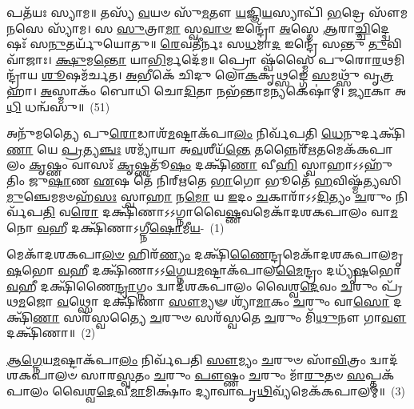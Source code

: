 𑌪𑌤᳴𑌯𑌃 𑌸𑍍𑌯𑌾𑌮॥ 𑌤𑌸𑍍𑌯᳴ \ul{𑌵}\-𑌯𑍞 𑌸𑍁᳴\-\ul{𑌮}\-𑌤𑍗 \ul{𑌯}\-𑌜𑍍𑌞𑌿\-\ul{𑌯}\-𑌸𑍍𑌯𑌾𑌪𑌿᳴ \ul{𑌭}\-𑌦𑍍𑌰𑍇 𑌸𑍗᳴𑌮\-\ul{𑌨}\-𑌸𑍇 𑌸𑍍𑌯𑌾᳴𑌮। 𑌸 \ul{𑌸𑍁}\-𑌤𑍍𑌰𑌾\-\ul{𑌮𑌾} 𑌸𑍍𑌵\-\ul{𑌵𑌾}\-\-\ul{𑍞} 𑌇𑌨𑍍𑌦𑍍𑌰𑍋᳴ \ul{𑌅}\-𑌸𑍍𑌮𑍇 \ul{𑌆}\-𑌰𑌾\-\ul{𑌚𑍍𑌚𑌿}\-𑌦𑍍𑌦𑍍𑌵𑍇𑌷𑌃᳴ 𑌸\-\ul{𑌨𑍁}\-𑌤𑌰𑍍𑌯𑍁᳴𑌯𑍋𑌤𑍁॥ \ul{𑌰𑍇}\-𑌵𑌤𑍀॑𑌰𑍍𑌨𑌃 𑌸\-\ul{𑌧}\-𑌮𑌾\-\ul{𑌦} 𑌇𑌨𑍍𑌦𑍍𑌰𑍇᳴ 𑌸𑌨𑍍𑌤𑍁 \ul{𑌤𑍁}\-𑌵𑌿𑌵𑌾᳴𑌜𑌾𑌃। \ul{𑌕𑍍𑌷𑍁}\-𑌮\-\ul{𑌨𑍍𑌤𑍋} 𑌯𑌾\-\ul{𑌭𑌿}\-𑌰𑍍𑌮𑌦𑍇᳴𑌮॥ 𑌪𑍍𑌰𑍋 𑌷𑍍𑌵᳴𑌸𑍍𑌮𑍈 𑌪𑍁𑌰𑍋\-\ul{𑌰}\-𑌥𑌮𑌿𑌨𑍍𑌦𑍍𑌰𑌾᳴𑌯 \ul{𑌶𑍂}\-𑌷𑌮᳴𑌰𑍍𑌚𑌤। \ul{𑌅}\-𑌭𑍀𑌕𑍇᳴ 𑌚𑌿𑌦𑍁 𑌲𑍋\-\ul{𑌕}\-𑌕𑍃\-\ul{𑌥𑍍𑌸}\-𑌙𑍍𑌗𑍇 \ul{𑌸}\-𑌮𑌥𑍍𑌸𑍁᳴ 𑌵𑍃\-\ul{𑌤𑍍𑌰}\-𑌹𑌾। \ul{𑌅}\-𑌸𑍍𑌮𑌾𑌕𑌂᳴ 𑌬𑍋𑌧𑌿 𑌚𑍋\-\ul{𑌦𑌿}\-𑌤𑌾 𑌨𑌭᳴𑌨𑍍𑌤𑌾𑌮\-\ul{𑌨𑍍𑌯}\-𑌕𑍇𑌷𑌾॑𑌮𑍍। \ul{𑌜𑍍𑌯𑌾}\-𑌕𑌾 𑌅\-\ul{𑌧𑌿} 𑌧𑌨𑍍𑌵᳴𑌸𑍁॥~(51)

{\anuvakamend[{\-\ul{𑌜}\-𑌰\-\ul{𑌸𑌾} 𑌮𑌾 𑌤𑍇᳴ 𑌹𑌰𑍍𑌯𑌶𑍍𑌵 \ul{𑌸𑍁}\-𑌵𑍀\-\ul{𑌰𑍍𑌯}\-𑌸𑍍𑌯𑌾𑌧𑍍𑌯𑍇𑌕𑌂᳴ 𑌚}]}%

\setcounter{anuvakam}{0}
𑌅𑌨𑍁᳴𑌮𑌤𑍍𑌯𑍈 𑌪𑍁\-\ul{𑌰𑍋}\-𑌡𑌾𑌶᳴\-\-\ul{𑌮}\-𑌷𑍍𑌟𑌾\-𑌕᳴𑌪𑌾\-\ul{𑌲𑌂} 𑌨𑌿𑌰𑍍𑌵᳴𑌪𑌤𑌿 \ul{𑌧𑍇}\-𑌨𑍁𑌰𑍍𑌦𑌕𑍍𑌷𑌿᳴\-\ul{𑌣𑌾} 𑌯𑍇 \ul{𑌪𑍍𑌰}\-𑌤𑍍𑌯\-\ul{𑌞𑍍𑌚𑌃} 𑌶𑌮𑍍𑌯𑌾᳴𑌯𑌾 𑌅\-\ul{𑌵}\-𑌶𑍀𑌯᳴\-\ul{𑌨𑍍𑌤𑍇} 𑌤𑌨𑍍𑌨𑍈𑌰𑍍᳴\-\ul{𑌋}\-𑌤𑌮𑍇𑌕᳴𑌕𑌪𑌾𑌲𑌂 \ul{𑌕𑍃}\-𑌷𑍍𑌣𑌂 𑌵𑌾𑌸𑌃᳴ \ul{𑌕𑍃}\-𑌷𑍍𑌣𑌤𑍂᳴\-\ul{𑌷𑌂} 𑌦𑌕𑍍𑌷𑌿᳴\-\ul{𑌣𑌾} 𑌵𑍀\-\ul{𑌹𑌿} 𑌸𑍍𑌵𑌾𑌹𑌾\-𑌽\-𑌽𑌹𑍁᳴𑌤𑌿𑌂 𑌜𑍁\-\ul{𑌷𑌾}\-𑌣 \ul{𑌏}\-𑌷 𑌤𑍇᳴ 𑌨𑌿𑌰𑍍\mbox{}𑌋𑌤𑍇 \ul{𑌭𑌾}\-𑌗𑍋 𑌭𑍂𑌤𑍇᳴ \ul{𑌹}\-𑌵𑌿𑌷𑍍𑌮᳴𑌤𑍍𑌯𑌸𑌿 \ul{𑌮𑍁}\-𑌞𑍍𑌚𑍇𑌮𑌮𑍞𑌹᳴\-\ul{𑌸𑌃} 𑌸𑍍𑌵𑌾\-\ul{𑌹𑌾} 𑌨\-\ul{𑌮𑍋} 𑌯 \ul{𑌇}\-𑌦𑌂 \ul{𑌚}\-𑌕𑌾𑌰𑌾᳴\-𑌽\-𑌽\-\ul{𑌦𑌿}\-𑌤𑍍𑌯𑌂 \ul{𑌚}\-𑌰𑍁𑌂 𑌨𑌿𑌰𑍍𑌵᳴𑌪\-\ul{𑌤𑌿} 𑌵\-\ul{𑌰𑍋} 𑌦𑌕𑍍𑌷𑌿᳴𑌣𑌾\-𑌽\-𑌽𑌗𑍍𑌨𑌾𑌵𑍈\-\ul{𑌷𑍍𑌣}\-𑌵𑌮𑍇𑌕𑌾᳴\-𑌦𑌶\-𑌕𑌪𑌾𑌲𑌂 𑌵𑌾\-\ul{𑌮}\-𑌨𑍋 \ul{𑌵}\-𑌹𑍀 𑌦𑌕𑍍𑌷𑌿᳴𑌣𑌾\-𑌽𑌗𑍍𑌨𑍀\-\ul{𑌷𑍋}\-𑌮𑍀\-\ul{𑌯}\--~(1)

𑌮𑍇𑌕𑌾᳴\-𑌦𑌶\-𑌕𑌪𑌾\-\ul{𑌲}\-\-\ul{𑍞} 𑌹𑌿𑌰᳴\-\ul{𑌣𑍍𑌯𑌂} 𑌦𑌕𑍍𑌷𑌿᳴\-\ul{𑌣𑍈}\-𑌨𑍍𑌦𑍍𑌰𑌮𑍇𑌕𑌾᳴\-𑌦𑌶\-𑌕𑌪𑌾𑌲𑌮𑍃\-\ul{𑌷}\-𑌭𑍋 \ul{𑌵}\-𑌹𑍀 𑌦𑌕𑍍𑌷𑌿᳴𑌣𑌾\-𑌽\-𑌽\-\ul{𑌗𑍍𑌨𑍇}\-𑌯\-\ul{𑌮}\-𑌷𑍍𑌟𑌾𑌕᳴𑌪𑌾𑌲\-\ul{𑌮𑍈}\-𑌨𑍍𑌦𑍍𑌰𑌂 𑌦𑌧𑍍𑌯𑍃᳴\-\ul{𑌷}\-𑌭𑍋 \ul{𑌵}\-𑌹𑍀 𑌦𑌕𑍍𑌷𑌿᳴𑌣𑍈\-\ul{𑌨𑍍𑌦𑍍𑌰𑌾}\-𑌗𑍍𑌨𑌂 𑌦𑍍𑌵𑌾𑌦᳴𑌶\-𑌕𑌪𑌾𑌲𑌂 𑌵𑍈𑌶𑍍𑌵\-\ul{𑌦𑍇}\-𑌵𑌂 \ul{𑌚}\-𑌰𑍁𑌂 𑌪𑍍𑌰᳴𑌥\-\ul{𑌮}\-𑌜𑍋 \ul{𑌵}\-𑌥𑍍𑌸𑍋 𑌦𑌕𑍍𑌷𑌿᳴𑌣𑌾 \ul{𑌸𑍗}\-𑌮𑍍𑌯𑍟 𑌶𑍍𑌯𑌾᳴\-\ul{𑌮𑌾}\-𑌕𑌂 \ul{𑌚}\-𑌰𑍁𑌂 𑌵𑌾\-\ul{𑌸𑍋} 𑌦𑌕𑍍𑌷𑌿᳴\-\ul{𑌣𑌾} 𑌸𑌰᳴𑌸𑍍𑌵𑌤𑍍𑌯𑍈 \ul{𑌚}\-𑌰𑍁𑍞 𑌸𑌰᳴𑌸𑍍𑌵𑌤𑍇 \ul{𑌚}\-𑌰𑍁𑌂 𑌮𑌿᳴\-\ul{𑌥𑍁}\-𑌨𑍗 𑌗𑌾\-\ul{𑌵𑍗} 𑌦𑌕𑍍𑌷𑌿᳴𑌣𑌾॥~(2)

{\anuvakamend[{\-\ul{𑌅}\-\-\ul{𑌗𑍍𑌨𑍀}\-\-\ul{𑌷𑍋}\-𑌮𑍀\-\ul{𑌯𑌂} 𑌚𑌤𑍁᳴𑌸𑍍𑌤𑍍𑌰𑌿𑍞𑌶𑌚𑍍𑌚}]}%

\-\ul{𑌆}\-\-\ul{𑌗𑍍𑌨𑍇}\-𑌯\-\ul{𑌮}\-𑌷𑍍𑌟𑌾\-𑌕᳴𑌪𑌾\-\ul{𑌲𑌂} 𑌨𑌿𑌰𑍍𑌵᳴𑌪𑌤𑌿 \ul{𑌸𑍗}\-𑌮𑍍𑌯𑌂 \ul{𑌚}\-𑌰𑍁𑍞 𑌸𑌾᳴\-\ul{𑌵𑌿}\-𑌤𑍍𑌰𑌂 𑌦𑍍𑌵𑌾𑌦᳴𑌶\-𑌕𑌪𑌾𑌲𑍞 𑌸𑌾𑌰\-\ul{𑌸𑍍𑌵}\-𑌤𑌂 \ul{𑌚}\-𑌰𑍁𑌂 \ul{𑌪𑍗}\-𑌷𑍍𑌣𑌂 \ul{𑌚}\-𑌰𑍁𑌂 𑌮𑌾᳴\-\ul{𑌰𑍁}\-𑌤𑍞 \ul{𑌸}\-𑌪𑍍𑌤𑌕᳴𑌪𑌾𑌲𑌂 𑌵𑍈𑌶𑍍𑌵\-\ul{𑌦𑍇}\-𑌵𑍀\-\ul{𑌮𑌾}\-𑌮𑌿𑌕𑍍𑌷𑌾𑌂॑ 𑌦𑍍𑌯𑌾𑌵𑌾𑌪𑍃\-\ul{𑌥𑌿}\-𑌵𑍍𑌯᳴𑌮𑍇𑌕᳴𑌕𑌪𑌾𑌲𑌮𑍍॥~(3)

